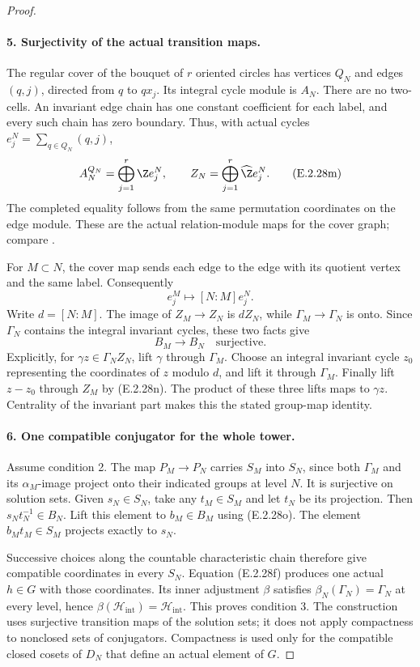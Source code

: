 \begin{proof}
\paragraph{5. Surjectivity of the actual transition maps.}
The regular cover of the bouquet of \(r\) oriented circles
has vertices \(Q_N\) and edges \((q,j)\), directed from
\(q\) to \(qx_j\). Its integral cycle module is \(A_N\).
There are no two-cells. An invariant edge chain has one
constant coefficient for each label, and every such chain
has zero boundary. Thus, with actual cycles
\(e_j^N=\sum_{q\in Q_N}(q,j)\),
\[
 A_N^{Q_N}=\bigoplus_{j=1}^r\Z e_j^N,\qquad
 Z_N=\bigoplus_{j=1}^r\widehat\Z e_j^N.
 \tag{E.2.28m}
\]
The completed equality follows from the same permutation
coordinates on the edge module. These are the actual
relation-module maps for the cover graph; compare
\cite[pp.~330--331]{GenBuxErshovRapinchuk2011}.

For \(M\subset N\), the cover map sends each edge to the edge
with its quotient vertex and the same label. Consequently
\[
 e_j^M\longmapsto [N:M]e_j^N.
 \tag{E.2.28n}
\]
Write \(d=[N:M]\). The image of \(Z_M\to Z_N\) is
\(dZ_N\), while \(\Gamma_M\to\Gamma_N\) is onto.
Since \(\Gamma_N\) contains the integral invariant cycles,
these two facts give
\[
 B_M\longrightarrow B_N\quad\text{surjective}.
 \tag{E.2.28o}
\]
Explicitly, for \(\gamma z\in\Gamma_N Z_N\), lift
\(\gamma\) through \(\Gamma_M\). Choose an integral
invariant cycle \(z_0\) representing the coordinates of
\(z\) modulo \(d\), and lift it through \(\Gamma_M\).
Finally lift \(z-z_0\) through \(Z_M\) by (E.2.28n).
The product of these three lifts maps to \(\gamma z\).
Centrality of the invariant part makes this the stated
group-map identity.

\paragraph{6. One compatible conjugator for the whole tower.}
Assume condition 2. The map \(P_M\to P_N\) carries
\(S_M\) into \(S_N\), since both \(\Gamma_M\) and its
\(\alpha_M\)-image project onto their indicated groups
at level \(N\). It is surjective on solution sets.
Given \(s_N\in S_N\), take any \(t_M\in S_M\) and let
\(t_N\) be its projection. Then
\(s_Nt_N^{-1}\in B_N\). Lift this element to
\(b_M\in B_M\) using (E.2.28o). The element
\(b_Mt_M\in S_M\) projects exactly to \(s_N\).

Successive choices along the countable characteristic chain
therefore give compatible coordinates in every \(S_N\).
Equation (E.2.28f) produces one actual \(h\in G\) with
those coordinates. Its inner adjustment \(\beta\) satisfies
\(\beta_N(\Gamma_N)=\Gamma_N\) at every level, hence
\(\beta(\mathcal H_{\mathrm{int}})=\mathcal H_{\mathrm{int}}\).
This proves condition 3. The construction uses surjective
transition maps of the solution sets; it does not apply
compactness to nonclosed sets of conjugators. Compactness
is used only for the compatible closed cosets of \(D_N\)
that define an actual element of \(G\).


\end{proof}
